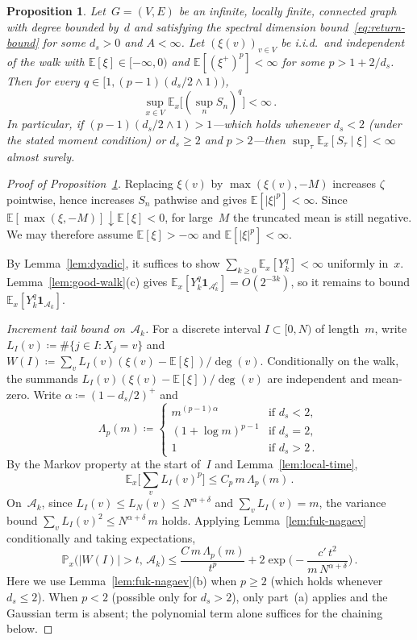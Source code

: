 \documentclass[aop]{imsart}
\theoremstyle{plain}
\newtheorem{proposition}[theorem]{Proposition}
\theoremstyle{definition}
\newcommand{\E}{\mathbb{E}}
\renewcommand{\P}{\mathbb{P}}
\newcommand{\one}{\mathbf{1}}
\begin{document}
	\begin{proposition}\label{prop:subcritical}
		Let~$G = (V,E)$ be an infinite, locally finite, connected graph with
		degree bounded by~$d$ and satisfying the spectral dimension bound~\eqref{eq:return-bound} for some $d_s>0$ and $A<\infty$.
		Let $(\xi(v))_{v\in V}$ be i.i.d.\ and independent of the walk with
		$\E[\xi] \in [-\infty, 0)$ and $\E[(\xi^+)^p]<\infty$ for some $p>1+2/d_s$.
		Then for every $q\in[1,(p-1)(d_s/2\wedge 1))$,
		\[
		\sup_{x\in V}\E_x\bigl[(\sup_n S_n)^q\bigr]<\infty\,.
		\]
		In particular, if $(p-1)(d_s/2\wedge 1)> 1$---which holds whenever $d_s<2$ (under the stated moment condition) or $d_s\geq 2$ and $p> 2$---then $\sup_\tau\E_x[S_\tau\mid\xi]<\infty$ almost surely.
	\end{proposition}
	
	\begin{proof}[Proof of Proposition~\textup{\ref{prop:subcritical}}]
		Replacing $\xi(v)$ by $\max(\xi(v),-M)$ increases $\zeta$ pointwise, hence increases $S_n$ pathwise and gives $\E[|\xi|^p]<\infty$. Since $\E[\max(\xi,-M)]\downarrow\E[\xi]<0$, for large~$M$ the truncated mean is still negative. We may therefore assume $\E[\xi]>-\infty$ and $\E[|\xi|^p]<\infty$.
		
		By Lemma~\ref{lem:dyadic}, it suffices to show $\sum_{k\geq 0}\E_x[Y_k^q]<\infty$ uniformly in~$x$. Lemma~\ref{lem:good-walk}(c) gives $\E_x[Y_k^q\one_{\mathcal{A}_k^c}]=O(2^{-3k})$, so it remains to bound $\E_x[Y_k^q\one_{\mathcal{A}_k}]$.
		
		\emph{Increment tail bound on~$\mathcal{A}_k$.}
		For a discrete interval $I\subset[0,N)$ of length~$m$, write $L_I(v)\coloneqq\#\{j\in I:X_j=v\}$ and $W(I)\coloneqq\sum_v L_I(v)(\xi(v)-\E[\xi])/\deg(v)$. Conditionally on the walk, the summands $L_I(v)(\xi(v)-\E[\xi])/\deg(v)$ are independent and mean-zero. Write $\alpha\coloneqq(1-d_s/2)^+$ and
		\[
		\Lambda_p(m)\coloneqq\begin{cases}
			m^{(p-1)\alpha} & \text{if } d_s<2,\\[3pt]
			(1{+}\log m)^{p-1} & \text{if } d_s=2,\\[3pt]
			1 & \text{if } d_s>2\,.
		\end{cases}\,
		\]
		By the Markov property at the start of~$I$ and Lemma~\ref{lem:local-time},
		\begin{equation}\label{eq:poly-moment}
			\E_x\biggl[\sum_v L_I(v)^p\biggr]\leq C_p\,m\,\Lambda_p(m)\,.
		\end{equation}
		On~$\mathcal{A}_k$, since $L_I(v)\leq L_N(v)\leq N^{\alpha+\delta}$ and $\sum_v L_I(v)=m$, the variance bound $\sum_v L_I(v)^2\leq N^{\alpha+\delta}\,m$ holds. Applying Lemma~\ref{lem:fuk-nagaev} conditionally and taking expectations,
		\begin{equation}\label{eq:w-tail}
			\P_x\bigl(|W(I)|>t,\,\mathcal{A}_k\bigr)
			\leq\frac{C\,m\,\Lambda_p(m)}{t^p}
			+2\exp\biggl(-\frac{c'\,t^2}{m\,N^{\alpha+\delta}}\biggr)\,.
		\end{equation}
		Here we use Lemma~\ref{lem:fuk-nagaev}(b) when $p\geq 2$ (which holds whenever $d_s\leq 2$). When $p<2$ (possible only for $d_s>2$), only part~(a) applies and the Gaussian term is absent; the polynomial term alone suffices for the chaining below.
		

\end{proof}
\end{document}
